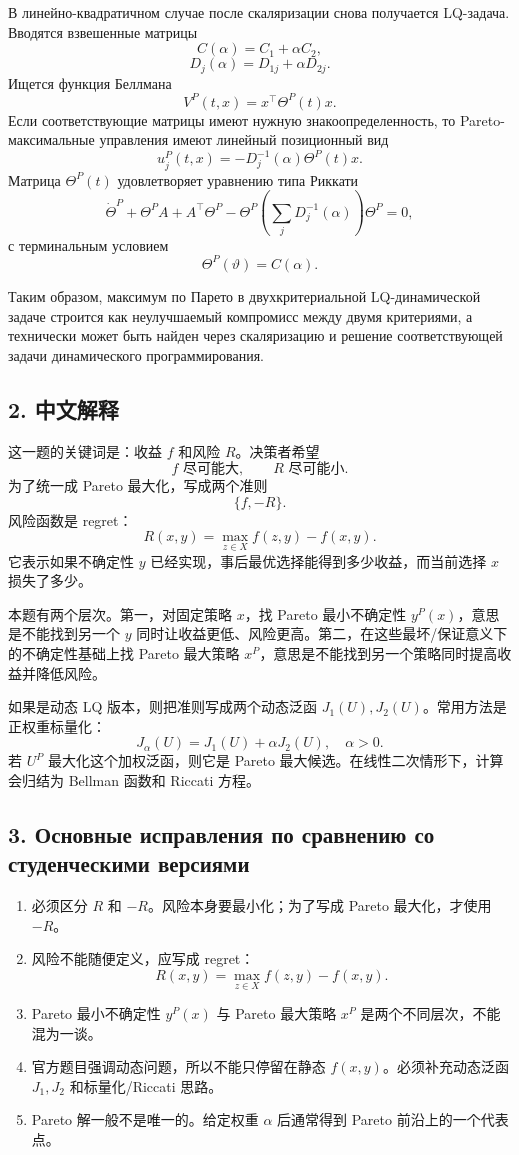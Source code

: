 \documentclass[12pt,a4paper]{article}
\newcommand{\cnexplain}{\subsection*{2. 中文解释}}
\newcommand{\corrections}{\subsection*{3. Основные исправления по сравнению со студенческими версиями}}
\begin{document}
В линейно-квадратичном случае после скаляризации снова получается LQ-задача. Вводятся взвешенные матрицы
\[
C(\alpha)=C_1+\alpha C_2,
\]
\[
D_j(\alpha)=D_{1j}+\alpha D_{2j}.
\]
Ищется функция Беллмана
\[
V^P(t,x)=x^{\top}\Theta^P(t)x.
\]
Если соответствующие матрицы имеют нужную знакоопределенность, то Pareto-максимальные управления имеют линейный позиционный вид
\[
u_j^P(t,x)=-D_j^{-1}(\alpha)\Theta^P(t)x.
\]
Матрица \(\Theta^P(t)\) удовлетворяет уравнению типа Риккати
\[
\dot\Theta^P+
\Theta^P A+A^{\top}\Theta^P-
\Theta^P\left(\sum_jD_j^{-1}(\alpha)\right)\Theta^P=0,
\]
с терминальным условием
\[
\Theta^P(\vartheta)=C(\alpha).
\]

Таким образом, максимум по Парето в двухкритериальной LQ-динамической задаче строится как неулучшаемый компромисс между двумя критериями, а технически может быть найден через скаляризацию и решение соответствующей задачи динамического программирования.

\cnexplain
这一题的关键词是：收益 \(f\) 和风险 \(R\)。决策者希望
\[
f\text{ 尽可能大},\qquad R\text{ 尽可能小}.
\]
为了统一成 Pareto 最大化，写成两个准则
\[
\{f,-R\}.
\]
风险函数是 regret：
\[
R(x,y)=\max_{z\in X}f(z,y)-f(x,y).
\]
它表示如果不确定性 \(y\) 已经实现，事后最优选择能得到多少收益，而当前选择 \(x\) 损失了多少。

本题有两个层次。第一，对固定策略 \(x\)，找 Pareto 最小不确定性 \(y^P(x)\)，意思是不能找到另一个 \(y\) 同时让收益更低、风险更高。第二，在这些最坏/保证意义下的不确定性基础上找 Pareto 最大策略 \(x^P\)，意思是不能找到另一个策略同时提高收益并降低风险。

如果是动态 LQ 版本，则把准则写成两个动态泛函 \(J_1(U),J_2(U)\)。常用方法是正权重标量化：
\[
J_\alpha(U)=J_1(U)+\alpha J_2(U),\quad \alpha>0.
\]
若 \(U^P\) 最大化这个加权泛函，则它是 Pareto 最大候选。在线性二次情形下，计算会归结为 Bellman 函数和 Riccati 方程。

\corrections
\begin{enumerate}
\item 必须区分 \(R\) 和 \(-R\)。风险本身要最小化；为了写成 Pareto 最大化，才使用 \(-R\)。
\item 风险不能随便定义，应写成 regret：
\[
R(x,y)=\max_{z\in X}f(z,y)-f(x,y).
\]
\item Pareto 最小不确定性 \(y^P(x)\) 与 Pareto 最大策略 \(x^P\) 是两个不同层次，不能混为一谈。
\item 官方题目强调动态问题，所以不能只停留在静态 \(f(x,y)\)。必须补充动态泛函 \(J_1,J_2\) 和标量化/Riccati 思路。
\item Pareto 解一般不是唯一的。给定权重 \(\alpha\) 后通常得到 Pareto 前沿上的一个代表点。
\end{enumerate}
\end{document}
